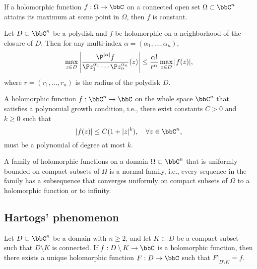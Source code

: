     \begin{proposition}\label{prop:rigidity_of_holomorphic_functions}
        If a holomorphic function \(f: \Omega \to \bbC\) on a connected open set \(\Omega \subset \bbC^n\) attains its maximum at some point in \(\Omega\), then \(f\) is constant.
    \end{proposition}

    \begin{proposition}\label{prop:Cauchy_estimates}
        Let \(D \subset \bbC^n\) be a polydisk and \(f\) be holomorphic on a neighborhood of the closure of \(D\). Then for any multi-index \(\alpha = (\alpha_1, \ldots, \alpha_n)\),
        \[ \max_{z \in D} \left| \frac{\P^{|\alpha|} f}{\P z_1^{\alpha_1} \cdots \P z_n^{\alpha_n}}(z) \right| \leq \frac{\alpha!}{r^\alpha} \max_{z \in D} |f(z)|, \]
        where \(r = (r_1, \ldots, r_n)\) is the radius of the polydisk \(D\).
    \end{proposition}

    \begin{theorem}\label{thm:generalized_Liouville_Theorem}
        A holomorphic function \(f: \bbC^n \to \bbC\) on the whole space \(\bbC^n\) that satisfies a polynomial growth condition, i.e., there exist constants \(C > 0\) and \(k \geq 0\) such that 
        \[ |f(z)| \leq C(1 + |z|^k), \quad \forall z \in \bbC^n, \]
        must be a polynomial of degree at most \(k\).
    \end{theorem}

    \begin{theorem}\label{thm:Montel's_Theorem}
        A family of holomorphic functions on a domain \(\Omega \subset \bbC^n\) that is uniformly bounded on compact subsets of \(\Omega\) is a normal family, i.e., every sequence in the family has a subsequence that converges uniformly on compact subsets of \(\Omega\) to a holomorphic function or to infinity.
    \end{theorem}

\subsection{Hartogs' phenomenon}

    \begin{theorem}\label{thm:Hartogs'_Extension_Theorem}
        Let \(D \subset \bbC^n\) be a domain with \(n \geq 2\), and let \(K \subset D\) be a compact subset such that \(D \setminus K\) is connected. If \(f: D \setminus K \to \bbC\) is a holomorphic function, then there exists a unique holomorphic function \(F: D \to \bbC\) such that \(F|_{D \setminus K} = f\).
    \end{theorem}

